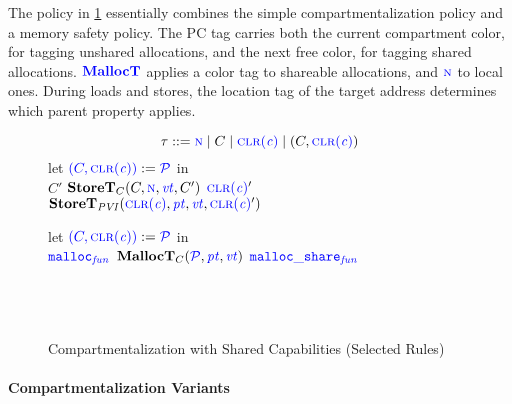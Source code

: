 \documentclass{llncs}
\begin{document}
The policy in \cref{fig:sharing} essentially combines the simple compartmentalization policy
and a memory safety policy. The PC tag carries both the current compartment color, for tagging
unshared allocations, and the next free color, for tagging shared allocations.
\(\malloctname\) applies a color tag to shareable allocations, and \(\N\) to local ones.
During loads and stores, the location tag of the target address
determines which parent property applies.

\begin{figure}[t]
  \color{blue}
  \begin{minipage}{0.5\textwidth}
    \[\tau ::= \N \mid C \mid \clr \mid (C,\clr)\]
    \scriptsize
    \storetruleblock
        {let  \({\color{blue}(C,\clr)} := \PCT\) in \\
          \caseoftwo{\(\lt\)}
                    {\color{blue} \(C'\)}{\color{blue} \(\mathbf{StoreT}_C(C,\N,\vt,C')\)}
                    {\color{blue} \(\clr'\)}{\color{blue} \(\mathbf{StoreT}_{\mathit{PVI}}(\clr,\pt,\vt,\clr')\)}}
  \end{minipage}
  \begin{minipage}{0.5\textwidth}
    \scriptsize
    \malloctruleblock
      {let \({\color{blue} (C,\clr)} := \PCT\) in \\
        \caseoftwo{\(\pt\)}
                  {\(\FN[malloc]\)}{\color{blue} \(\mathbf{MallocT}_{C}(\PCT,\pt,\vt)\)}
                  {\(\FN[malloc\_share]\)}
                  {\\ \\
                     \\
                     \\}
      }
  \end{minipage}
  
  \caption{Compartmentalization with Shared Capabilities (Selected Rules)}
  \label{fig:sharing}
\end{figure}

\paragraph*{Compartmentalization Variants}
\end{document}
